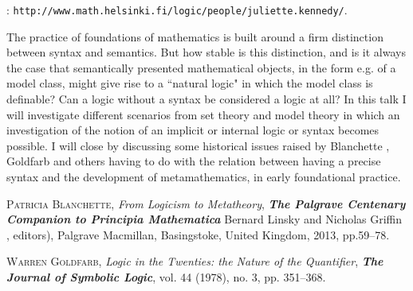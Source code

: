 \documentclass[bsl,meeting]{asl}
\def\urladdr#1{\endgraf\noindent{\it URL Address}: {\tt #1}.}
\newcommand{\NP}{}
\begin{document}
\thispagestyle{empty}


\NP  
{}
\urladdr{http://www.math.helsinki.fi/logic/people/juliette.kennedy/}

The practice of foundations of mathematics is built around a firm distinction between syntax and semantics. But how stable is this distinction, and is it always the case that semantically presented mathematical objects, in the form e.g. of a model class, might give rise to a ``natural logic"  in which the model class is definable? Can a logic without a syntax be considered a logic at all? In this talk I will investigate different scenarios from set theory and model theory in which an investigation of the notion of an implicit or internal logic or syntax becomes possible. I will close by discussing some historical issues raised by Blanchette \cite{paddy}, Goldfarb \cite{goldfarb} and others having to do with the relation between having a precise syntax and the development of metamathematics, in early foundational practice.

\begin{thebibliography}{10}


{\scshape Patricia Blanchette},
{\itshape From Logicism to Metatheory},
{\bfseries\itshape The Palgrave Centenary Companion to Principia Mathematica}
Bernard Linsky and Nicholas Griffin , editors),
 Palgrave Macmillan,
Basingstoke, United Kingdom,
2013,
pp.59--78.

{\scshape Warren Goldfarb},
{\itshape Logic in the Twenties: the Nature of the Quantifier},
{\bfseries\itshape The Journal of Symbolic Logic},
vol. 44 (1978), no. 3, pp. 351--368.

\end{thebibliography}


\vspace*{-0.5\baselineskip}
\end{document}
